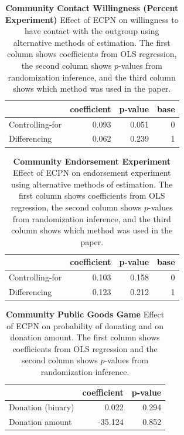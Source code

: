 \documentclass[
]{article}
\begin{document}
\begin{table}[H]
\begin{center}
\label{tab:percExp_tab}
\caption{\textbf{Community Contact Willingness (Percent Experiment)} Effect of ECPN on willingness to have contact with the outgroup using alternative methods of estimation. The first column shows coefficients from OLS regression, the second column shows $p$-values from randomization inference, and the third column shows which method was used in the paper.}
\smallskip

\begin{tabular}{l|r|r|r}
\hline
  & coefficient & p-value & base\\
\hline
Controlling-for & 0.093 & 0.051 & 0\\
\hline
Differencing & 0.062 & 0.239 & 1\\
\hline
\end{tabular}


\end{center}
\end{table}

\begin{table}[H]
\begin{center}
\label{tab:endExp_tab}
\caption{\textbf{Community Endorsement Experiment} Effect of ECPN on endorsement experiment using alternative methods of estimation. The first column shows coefficients from OLS regression, the second column shows $p$-values from randomization inference, and the third column shows which method was used in the paper.}
\smallskip

\begin{tabular}{l|r|r|r}
\hline
  & coefficient & p-value & base\\
\hline
Controlling-for & 0.103 & 0.158 & 0\\
\hline
Differencing & 0.123 & 0.212 & 1\\
\hline
\end{tabular}


\end{center}
\end{table}

\begin{table}[H]
\begin{center}
\label{tab:pgg_tab}
\caption{\textbf{Community Public Goods Game} Effect of ECPN on probability of donating and on donation amount. The first column shows coefficients from OLS regression and the second column shows $p$-values from randomization inference.}
\smallskip

\begin{tabular}{l|r|r}
\hline
  & coefficient & p-value\\
\hline
Donation (binary) & 0.022 & 0.294\\
\hline
Donation amount & -35.124 & 0.852\\
\hline
\end{tabular}


\end{center}
\end{table}
\end{document}
